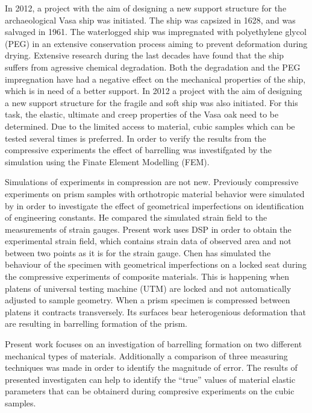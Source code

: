 \documentclass[review]{elsarticle}
\begin{document}
In 2012, a project with the aim of designing a new support structure for the
archaeological Vasa ship was initiated. The ship was capsized in 1628, and was salvaged in 1961. 
The waterlogged ship was impregnated with polyethylene glycol (PEG) in an extensive conservation process aiming to prevent deformation during drying. 
Extensive research during the last decades have found that the ship suffers from
agressive chemical degradation. Both the degradation \cite{bjurhager2012state} and the PEG impregnation \cite{ljungdahl2007transverse}
 have had a negative effect on the mechanical properties of the ship, which is in need of a better support. In 2012 a project with the aim of 
designing a new support structure for the fragile and soft ship was also initiated. For this task, the elastic, ultimate and creep properties of the 
Vasa oak need to be determined. Due to the limited access to material, cubic samples which can be tested several times is preferred.
In order to verify the results from the compressive experiments the effect of
barrelling was investifgated by the simulation using the Finate Element
Modelling (FEM).

Simulations of experiments in compression are not new. Previously compressive
experiments on prism samples with orthotropic material behavior were simulated
by \cite{Toftegaard1999849} in order to investigate the effect of geometrical imperfections on identification of engineering constants. 
He compared the simulated strain field to the measurements of strain gauges. 
Present work uses DSP in order to obtain the experimental strain field, which
contains strain data of observed area and not between two points as it is for the strain gauge. 
Chen \cite{Chen001} has simulated the behaviour of the specimen with geometrical
imperfections on a locked  seat during the compressive experiments
of composite materials. This is happening when platens of universal testing
machine (UTM) are locked and not automatically adjusted to sample geometry.
When a prism specimen is compressed between platens it contracts transversely.
Its surfaces bear heterogenious deformation that are resulting in barrelling
formation of the prism. 




Present work focuses on an investigation of
barrelling formation on two different mechanical types of materials. Additionally a comparison of three measuring techniques was made in order to identify the magnitude of error.
The results of presented investigaten can help to identify the ``true'' values
of material elastic parameters that can be obtainerd during compresive
experiments on the cubic samples. 
\end{document}
